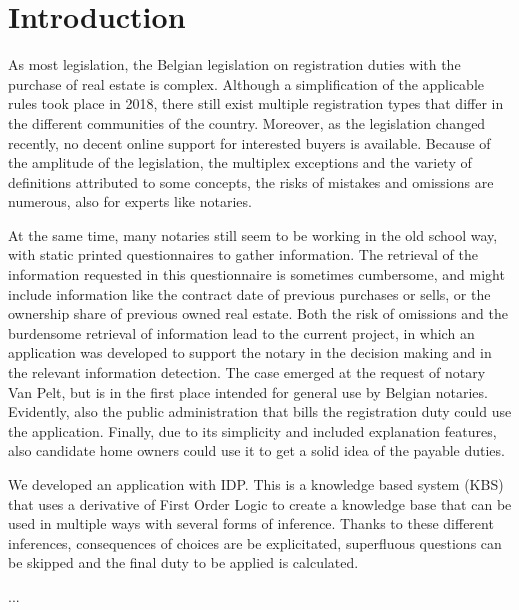 \section{Introduction}

As most legislation, the Belgian legislation on registration duties with the purchase of real estate is complex.
Although a simplification of the applicable rules took place in 2018, there still exist multiple registration types that differ in the different communities of the country.
Moreover, as the legislation changed recently, no decent online support for interested buyers is available.
Because of the amplitude of the legislation, the multiplex exceptions and the variety of definitions attributed to some concepts, the risks of mistakes and omissions are numerous, also for experts like notaries.

At the same time, many notaries still seem to be working in the old school way, with static printed questionnaires to gather information.
The retrieval of the information requested in this questionnaire is sometimes cumbersome, and might include information like the contract date of previous purchases or sells, or the ownership share of previous owned real estate.
Both the risk of omissions and the burdensome retrieval of information lead to the current project, in which an application was developed to support the notary in the decision making and in the relevant information detection.
The case emerged at the request of notary Van Pelt, but is in the first place intended for general use by Belgian notaries.
Evidently, also the public administration that bills the registration duty could use the application.
Finally, due to its simplicity and included explanation features, also candidate home owners could use it to get a solid idea of the payable duties.

We developed an application with IDP.  
This is a knowledge based system (KBS) that uses a derivative of First Order Logic to create a knowledge base that can be used in multiple ways with several forms of inference.
Thanks to these different inferences, consequences of choices are be explicitated, superfluous questions can be skipped and the final duty to be applied is calculated.

...
